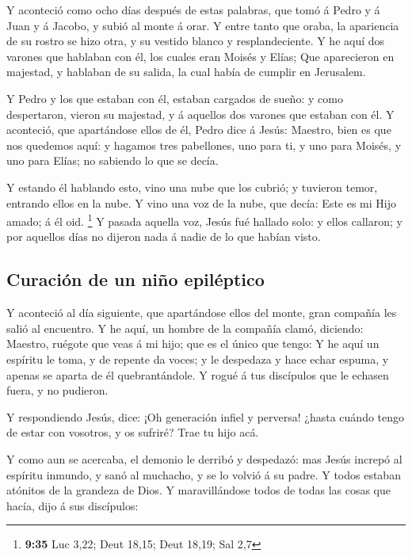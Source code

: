  Y aconteció como ocho días después de estas palabras,
que tomó á Pedro y á Juan y á Jacobo, y subió al monte á orar.
 Y entre tanto que oraba, la apariencia de su rostro se
hizo otra, y su vestido blanco y resplandeciente.  Y he
aquí dos varones que hablaban con él, los cuales eran Moisés y Elías;
 Que aparecieron en majestad, y hablaban de su salida, la
cual había de cumplir en Jerusalem.

 Y Pedro y los que estaban con él, estaban cargados de
sueño: y como despertaron, vieron su majestad, y á aquellos dos varones
que estaban con él.  Y aconteció, que apartándose ellos
de él, Pedro dice á Jesús: Maestro, bien es que nos quedemos aquí: y
hagamos tres pabellones, uno para ti, y uno para Moisés, y uno para
Elías; no sabiendo lo que se decía.

 Y estando él hablando esto, vino una nube que los
cubrió; y tuvieron temor, entrando ellos en la nube.  Y
vino una voz de la nube, que decía: Este es mi Hijo amado; á él oid.
\footnote{\textbf{9:35} Luc 3,22; Deut 18,15; Deut 18,19; Sal 2,7}
 Y pasada aquella voz, Jesús fué hallado solo: y ellos
callaron; y por aquellos días no dijeron nada á nadie de lo que habían
visto.

\hypertarget{curaciuxf3n-de-un-niuxf1o-epiluxe9ptico}{%
\subsection{Curación de un niño
epiléptico}\label{curaciuxf3n-de-un-niuxf1o-epiluxe9ptico}}

 Y aconteció al día siguiente, que apartándose ellos del
monte, gran compañía les salió al encuentro.  Y he aquí,
un hombre de la compañía clamó, diciendo: Maestro, ruégote que veas á mi
hijo; que es el único que tengo:  Y he aquí un espíritu
le toma, y de repente da voces; y le despedaza y hace echar espuma, y
apenas se aparta de él quebrantándole.  Y rogué á tus
discípulos que le echasen fuera, y no pudieron.

 Y respondiendo Jesús, dice: ¡Oh generación infiel y
perversa! ¿hasta cuándo tengo de estar con vosotros, y os sufriré? Trae
tu hijo acá.

 Y como aun se acercaba, el demonio le derribó y
despedazó: mas Jesús increpó al espíritu inmundo, y sanó al muchacho, y
se lo volvió á su padre.  Y todos estaban atónitos de la
grandeza de Dios. Y maravillándose todos de todas las cosas que hacía,
dijo á sus discípulos:


